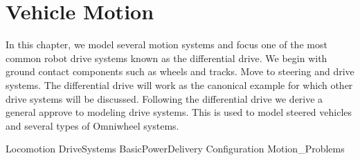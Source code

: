 \hypertarget{Chap:Motion}{%
\section{Vehicle Motion}\label{Chap:Motion}}

In this chapter, we model several motion systems and focus one of the
most common robot drive systems known as the differential drive. We
begin with ground contact components such as wheels and tracks. Move to
steering and drive systems. The differential drive will work as the
canonical example for which other drive systems will be discussed.
Following the differential drive we derive a general approve to modeling
drive systems. This is used to model steered vehicles and several types
of Omniwheel systems.

Locomotion DriveSystems BasicPowerDelivery Configuration
Motion\_Problems
